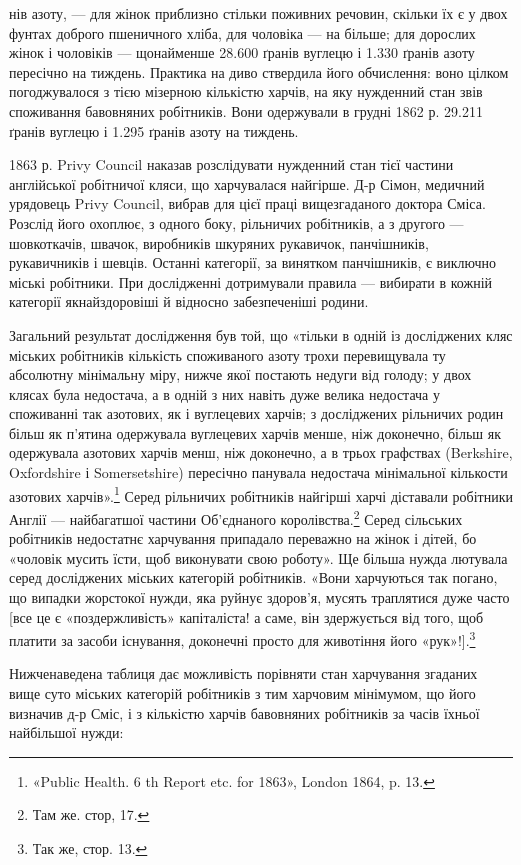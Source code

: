 \parcont{}  %
нів азоту, — для жінок приблизно стільки поживних речовин,
скільки їх є у двох фунтах доброго пшеничного хліба, для чоловіка — на  більше; для дорослих
жінок і чоловіків — щонайменше
28.600 ґранів вуглецю і 1.330 ґранів азоту пересічно на тиждень.
Практика на диво ствердила його обчислення: воно цілком погоджувалося
з тією мізерною кількістю харчів, на яку нужденний
стан звів споживання бавовняних робітників. Вони одержували
в грудні 1862 р. 29.211 ґранів вуглецю і 1.295 ґранів азоту
на тиждень.

1863 р. Privy Council наказав розслідувати нужденний стан
тієї частини англійської робітничої кляси, що харчувалася найгірше.
Д-р Сімон, медичний урядовець Privy Council, вибрав
для цієї праці вищезгаданого доктора Сміса. Розслід його охоплює,
з одного боку, рільничих робітників, а з другого — шовкоткачів,
швачок, виробників шкуряних рукавичок, панчішників,
рукавичників і шевців. Останні категорії, за винятком панчішників,
є виключно міські робітники. При дослідженні дотримували
правила — вибирати в кожній категорії якнайздоровіші
й відносно забезпеченіші родини.

Загальний результат дослідження був той, що «тільки в
одній із досліджених кляс міських робітників кількість споживаного
азоту трохи перевищувала ту абсолютну мінімальну
міру, нижче якої постають недуги від голоду; у двох клясах
була недостача, а в одній з них навіть дуже велика недостача
у споживанні так азотових, як і вуглецевих харчів; з досліджених
рільничих родин більш як п’ятина одержувала вуглецевих
харчів менше, ніж доконечно, більш як  одержувала
азотових харчів менш, ніж доконечно, а в трьох графствах
(Berkshire, Oxfordshire і Somersetshire) пересічно панувала недостача
мінімальної кількости азотових харчів».\footnote{
«Public Health. 6 th Report etc. for 1863», London 1864, p. 13.
} Серед рільничих
робітників найгірші харчі діставали робітники Англії —
найбагатшої частини Об’єднаного королівства.\footnote{
Там же. стор, 17.
} Серед сільських
робітників недостатнє харчування припадало переважно
на жінок і дітей, бо «чоловік мусить їсти, щоб виконувати свою
роботу». Ще більша нужда лютувала серед досліджених міських
категорій робітників. «Вони харчуються так погано, що випадки
жорстокої нужди, яка руйнує здоров’я, мусять траплятися дуже
часто [все це є «поздержливість» капіталіста! а саме, він здержується
від того, щоб платити за засоби існування, доконечні
просто для животіння його «рук»!].\footnote{
Так же, стор. 13.
}

Нижченаведена таблиця дає можливість порівняти стан харчування
згаданих вище суто міських категорій робітників з
тим харчовим мінімумом, що його визначив д-р Сміс, і з
кількістю харчів бавовняних робітників за часів їхньої найбільшої
нужди:
\parbreak{}  %
